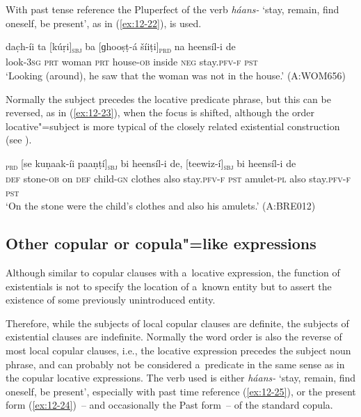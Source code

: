 With past tense reference the Pluperfect of the verb \textit{háans-} `stay, remain, find oneself, be present', as in (\ref{ex:12-22}), is used.

\begin{exe}
\ex
\label{ex:12-22}
\gll dac̣h-íi ta [kúṛi]\textsubscript{\textsc{sbj}} ba [ɡhooṣṭ-á šíiṭi]\textsubscript{\textsc{prd}} na heensíl-i de \\
look-3\textsc{sg} \textsc{prt} woman \textsc{prt} house-\textsc{ob} inside \textsc{neg} stay.\textsc{pfv-f} \textsc{pst} \\
\glt `Looking (around), he saw that the woman was not in the house.' (A:WOM656)
\end{exe}

Normally the subject precedes the locative predicate phrase, but this can be reversed, as in (\ref{ex:12-23}), when the focus is shifted, although the order locative"=subject is more typical of the closely related existential construction (see ).

\begin{exe}
\ex
\label{ex:12-23}
\textsubscript{\textsc{prd}} [se kuṇaak-íi paaṇṭí]\textsubscript{\textsc{sbj}} bi heensíl-i de, [teewiz-í]\textsubscript{\textsc{sbj}} bi heensíl-i de \\
\textsc{def} stone-\textsc{ob} on \textsc{def} child-\textsc{gn} clothes  also stay.\textsc{pfv-f}
\textsc{pst} amulet-\textsc{pl} also stay.\textsc{pfv-f} \textsc{pst} \\
\glt `On the stone were the child's clothes and also his amulets.' (A:BRE012)
\end{exe}

\subsection{Other copular or copula"=like expressions}
\label{subsec:12-1-4}

 Although similar to copular clauses with a~locative expression, the function of existentials is not to specify the location of a~known entity but to assert the existence of some previously unintroduced entity. 


Therefore, while the subjects of local copular clauses are definite, the subjects of existential clauses are indefinite. Normally the word order is also the reverse of most local copular clauses, i.e., the locative expression precedes the subject noun phrase, and can probably not be considered a~predicate in the same sense as in the copular locative expressions. The verb used is either \textit{háans-} `stay, remain, find oneself, be present', especially with past time reference (\ref{ex:12-25}), or the present form (\ref{ex:12-24})~-- and occasionally the Past form~-- of the standard copula.

